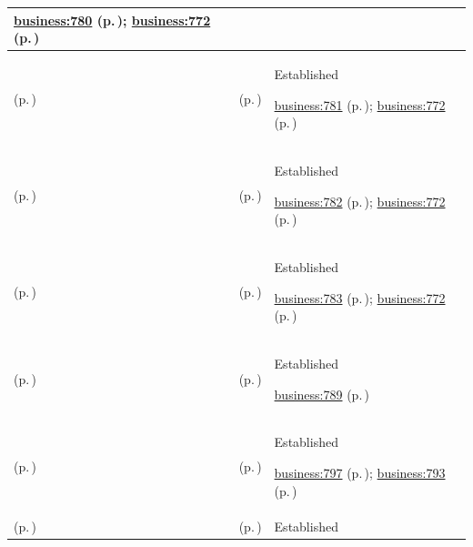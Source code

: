 \begin{longtable}{|>{\raggedright\arraybackslash}p{0.27\TableWidth}|>{\raggedright\arraybackslash}p{0.27\TableWidth}|>{\raggedright\arraybackslash}p{0.46\TableWidth}|}
 \hyperref[rad:business:774]{business:780} (p.\,\pageref{rad:business:774}); \hyperref[rad:business:772]{business:772} (p.\,\pageref{rad:business:772})\\\hline
\nameref{cap:bc-digital-identity-access-governance} (p.\,\pageref{cap:bc-digital-identity-access-governance}) & \nameref{cap:bc-access-control-assurance-reporting} (p.\,\pageref{cap:bc-access-control-assurance-reporting}) & Established

 \hyperref[rad:business:774]{business:781} (p.\,\pageref{rad:business:774}); \hyperref[rad:business:772]{business:772} (p.\,\pageref{rad:business:772})\\\hline
\nameref{cap:bc-digital-identity-access-governance} (p.\,\pageref{cap:bc-digital-identity-access-governance}) & \nameref{cap:bc-access-control-collaboration} (p.\,\pageref{cap:bc-access-control-collaboration}) & Established

 \hyperref[rad:business:774]{business:782} (p.\,\pageref{rad:business:774}); \hyperref[rad:business:772]{business:772} (p.\,\pageref{rad:business:772})\\\hline
\nameref{cap:bc-digital-identity-access-governance} (p.\,\pageref{cap:bc-digital-identity-access-governance}) & \nameref{cap:bc-access-control-enforcement} (p.\,\pageref{cap:bc-access-control-enforcement}) & Established

 \hyperref[rad:business:774]{business:783} (p.\,\pageref{rad:business:774}); \hyperref[rad:business:772]{business:772} (p.\,\pageref{rad:business:772})\\\hline
\nameref{cap:bc-security-privacy-digital-trust} (p.\,\pageref{cap:bc-security-privacy-digital-trust}) & \nameref{cap:bc-health-information-protection} (p.\,\pageref{cap:bc-health-information-protection}) & Established

 \hyperref[rad:business:789]{business:789} (p.\,\pageref{rad:business:789})\\\hline
\nameref{cap:bc-health-information-protection} (p.\,\pageref{cap:bc-health-information-protection}) & \nameref{cap:bc-health-privacy-safeguard-management} (p.\,\pageref{cap:bc-health-privacy-safeguard-management}) & Established

 \hyperref[rad:business:795]{business:797} (p.\,\pageref{rad:business:795}); \hyperref[rad:business:793]{business:793} (p.\,\pageref{rad:business:793})\\\hline
\nameref{cap:bc-health-information-protection} (p.\,\pageref{cap:bc-health-information-protection}) & \nameref{cap:bc-health-information-safeguarding} (p.\,\pageref{cap:bc-health-information-safeguarding}) & Established


\end{longtable}
